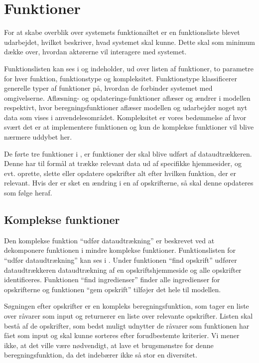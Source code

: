 \section{Funktioner}
\label{sec:funktioner}

For at skabe overblik over systemets funktionailtet er en funktionsliste  blevet udarbejdet, hvilket beskriver, hvad systemet skal kunne. Dette skal som minimum dække over, hvordan aktørerne vil interagere med systemet.

Funktionslisten kan ses i  og indeholder, ud over listen af funktioner, to parametre for hver funktion, funktionstype og kompleksitet. Funktionstype klassificerer generelle typer af funktioner på, hvordan de forbinder systemet med omgivelserne. Aflæsning- og opdaterings-funktioner aflæser og ændrer i modellen respektivt, hvor beregningsfunktioner aflæser modellen og udarbejder noget nyt data som vises i anvendelesområdet. Kompleksitet er vores bedømmelse af hvor svært det er at implementere funktionen og kun de komplekse funktioner vil blive nærmere uddybet her.



De førte tre funktioner i , er funktioner der skal blive udført af dataudtrækkeren. Denne har til formål at trække relevant data ud af specifikke hjemmesider, og evt. oprette, slette eller opdatere opskrifter alt efter hvilken funktion, der er relevant. Hvis der \fx er sket en ændring i en af opskrifterne, så skal denne opdateres som følge heraf. 

\subsection{Komplekse funktioner}
Den komplekse funktion ``udfør dataudtrækning'' er beskrevet ved at dekomponere funktionen i mindre komplekse funktioner. Funktionslisten for ``udfør dataudtrækning'' kan ses i . Under funktionen ``find opskrift'' udfører dataudtrækkeren dataudtrækning af en opskriftshjemmeside og alle opskrifter identificeres. Funktionen ``find ingredienser'' finder alle ingredienser for opskrifterne og funktionen ``gem opskrift'' tilføjer det hele til modellen.

Søgningen efter opskrifter er en kompleks beregningsfunktion, som tager en liste over råvarer som input og returnerer en liste over relevante opskrifter. Listen skal bestå af de opskrifter, som bedst muligt udnytter de råvarer som funktionen har fået som input og skal kunne sorteres efter forudbestemte kriterier. Vi mener ikke, at det ville være nødvendigt, at lave et brugsmønstre for denne beregningsfunktion, da det indebærer ikke så stor en diversitet.
